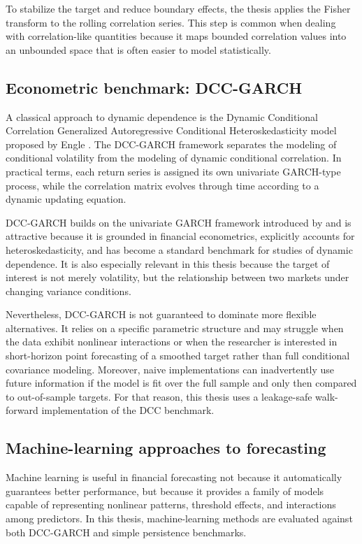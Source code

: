 To stabilize the target and reduce boundary effects, the thesis applies the Fisher transform to the rolling correlation series. This step is common when dealing with correlation-like quantities because it maps bounded correlation values into an unbounded space that is often easier to model statistically.

\subsection{Econometric benchmark: DCC-GARCH}

A classical approach to dynamic dependence is the Dynamic Conditional Correlation Generalized Autoregressive Conditional Heteroskedasticity model proposed by Engle \cite{engle2002}. The DCC-GARCH framework separates the modeling of conditional volatility from the modeling of dynamic conditional correlation. In practical terms, each return series is assigned its own univariate GARCH-type process, while the correlation matrix evolves through time according to a dynamic updating equation.

DCC-GARCH builds on the univariate GARCH framework introduced by \citet{bollerslev1986} and is attractive because it is grounded in financial econometrics, explicitly accounts for heteroskedasticity, and has become a standard benchmark for studies of dynamic dependence. It is also especially relevant in this thesis because the target of interest is not merely volatility, but the relationship between two markets under changing variance conditions.

Nevertheless, DCC-GARCH is not guaranteed to dominate more flexible alternatives. It relies on a specific parametric structure and may struggle when the data exhibit nonlinear interactions or when the researcher is interested in short-horizon point forecasting of a smoothed target rather than full conditional covariance modeling. Moreover, naive implementations can inadvertently use future information if the model is fit over the full sample and only then compared to out-of-sample targets. For that reason, this thesis uses a leakage-safe walk-forward implementation of the DCC benchmark.

\subsection{Machine-learning approaches to forecasting}

Machine learning is useful in financial forecasting not because it automatically guarantees better performance, but because it provides a family of models capable of representing nonlinear patterns, threshold effects, and interactions among predictors. In this thesis, machine-learning methods are evaluated against both DCC-GARCH and simple persistence benchmarks.

